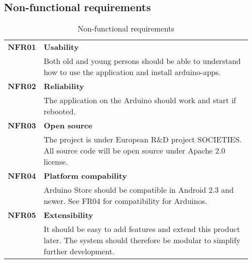 \subsection{Non-functional requirements}
\begin{table}[H]
\begin{tabularx}{\linewidth}{lX}
\textbf{NFR01} & \textbf{Usability}\\
 & Both old and young persons should be able to understand how to use the application and install arduino-apps.\\
\textbf{NFR02} & \textbf{Reliability}\\
 & The application on the Arduino should work and start if rebooted.\\
\textbf{NFR03} & \textbf{Open source}\\
 & The project is under European R\&D project SOCIETIES. All source code will be open source under Apache 2.0 license.\\
\textbf{NFR04} & \textbf{Platform compability}\\
 & Arduino Store should be compatible in Android 2.3 and newer. See FR04 for compatibility for Arduinos.\\
\textbf{NFR05} & \textbf{Extensibility}\\
 & It should be easy to add features and extend this product later. The system should therefore be modular to simplify further development.\\
\end{tabularx}
\caption{Non-functional requirements}
\end{table}